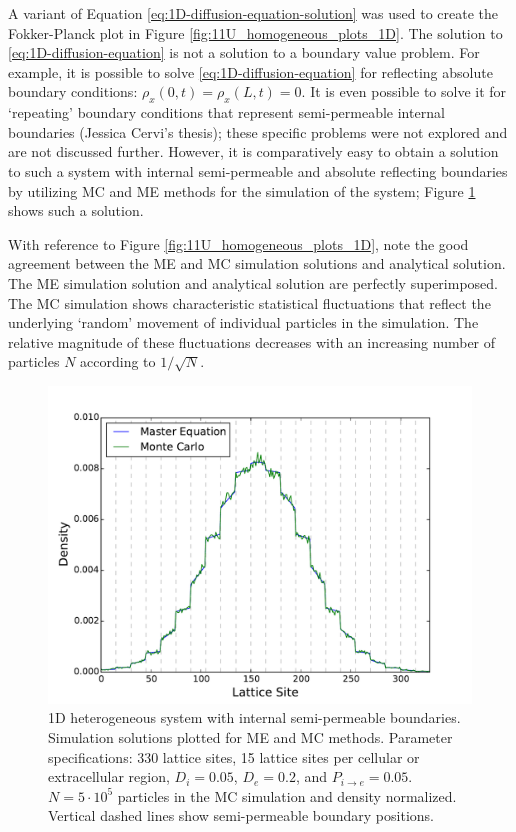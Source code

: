 	A variant of Equation \ref{eq:1D-diffusion-equation-solution} was used to create the Fokker-Planck plot in Figure \ref{fig:11U_homogeneous_plots_1D}. The solution to \ref{eq:1D-diffusion-equation} is not a solution to a boundary value problem. For example, it is possible to solve \ref{eq:1D-diffusion-equation} for reflecting absolute boundary conditions: $ \rho_x(0,t) = \rho_x(L,t) = 0 $. It is even possible to solve it for `repeating' boundary conditions that represent semi-permeable internal boundaries (Jessica Cervi's thesis); these specific problems were not explored and are not discussed further. However, it is comparatively easy to obtain a solution to such a system with internal semi-permeable and absolute reflecting boundaries by utilizing MC and ME methods for the simulation of the system; Figure \ref{fig:11U_heterogeneous_plots_1D} shows such a solution.
	
	With reference to Figure \ref{fig:11U_homogeneous_plots_1D}, note the good agreement between the ME and MC simulation solutions and analytical solution. The ME simulation solution and analytical solution are perfectly superimposed. The MC simulation shows characteristic statistical fluctuations that reflect the underlying `random' movement of individual particles in the simulation. The relative magnitude of these fluctuations decreases with an increasing number of particles $ N $ according to $ 1/\sqrt{N} $.

	\begin{figure}[h]
		\centering
		\includegraphics[width=1.0\linewidth]{../images/1D/11U_heterogeneous_plots_1D}
		\caption{1D heterogeneous system with internal semi-permeable boundaries. Simulation solutions plotted for ME and MC methods. Parameter specifications: 330 lattice sites, 15 lattice sites per cellular or extracellular region, $ D_i = 0.05 $, $ D_e = 0.2 $, and $ P_{i\rightarrow e} = 0.05 $. $ N = 5 \cdot 10^5 $ particles in the MC simulation and density normalized. Vertical dashed lines show semi-permeable boundary positions.}
		\label{fig:11U_heterogeneous_plots_1D}
	\end{figure}
	
